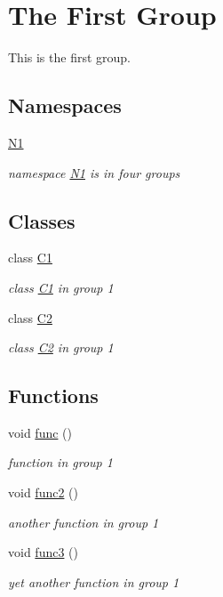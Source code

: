 \hypertarget{group__group1}{}\section{The First Group}
\label{group__group1}


This is the first group.  


\subsection*{Namespaces}
\begin{DoxyCompactItemize}
\item 
 \mbox{\hyperlink{namespace_n1}{N1}}
\begin{DoxyCompactList}\small\item\em namespace \mbox{\hyperlink{namespace_n1}{N1}} is in four groups \end{DoxyCompactList}\end{DoxyCompactItemize}
\subsection*{Classes}
\begin{DoxyCompactItemize}
\item 
class \mbox{\hyperlink{class_c1}{C1}}
\begin{DoxyCompactList}\small\item\em class \mbox{\hyperlink{class_c1}{C1}} in group 1 \end{DoxyCompactList}\item 
class \mbox{\hyperlink{class_c2}{C2}}
\begin{DoxyCompactList}\small\item\em class \mbox{\hyperlink{class_c2}{C2}} in group 1 \end{DoxyCompactList}\end{DoxyCompactItemize}
\subsection*{Functions}
\begin{DoxyCompactItemize}
\item 
void \mbox{\hyperlink{group__group1_ga24f647174760cac13d2624b5ad74b00c}{func}} ()
\begin{DoxyCompactList}\small\item\em function in group 1 \end{DoxyCompactList}\item 
void \mbox{\hyperlink{group__group1_ga053929c0809a5f56f7548fd7d9968f31}{func2}} ()
\begin{DoxyCompactList}\small\item\em another function in group 1 \end{DoxyCompactList}\item 
void \mbox{\hyperlink{group__group1_gadbf675591ff057ec48ce35b0d5cdf755}{func3}} ()
\begin{DoxyCompactList}\small\item\em yet another function in group 1 \end{DoxyCompactList}\end{DoxyCompactItemize}


